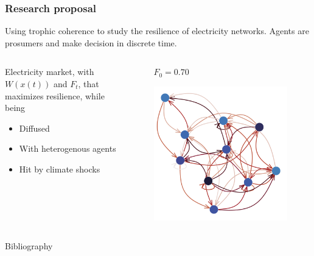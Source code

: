 \documentclass{beamer}
\begin{document}
\begin{frame}
    \frametitle{Research proposal}
    Using trophic coherence to study the resilience of electricity networks. Agents are prosumers and make decision in discrete time.


    \begin{columns}
        \begin{column}{.49\textwidth}
            Electricity market, with $W(x(t))$ and $F_t$, that maximizes resilience, while being
            \begin{itemize}
                \item Diffused
                \item With heterogenous agents
                \item Hit by climate shocks
            \end{itemize}
        \end{column}
        \begin{column}{.49\textwidth}
            \begin{figure}
                \textbf{$F_0 = 0.70$}\par\medskip
                \includegraphics[width=\linewidth,height=0.4\textheight,keepaspectratio]{../../plots/presentations/electricity.png}
            \end{figure}
        \end{column}
    \end{columns}
\end{frame}


\begin{frame}[allowframebreaks]{Bibliography}
    
    
\end{frame}
\end{document}
